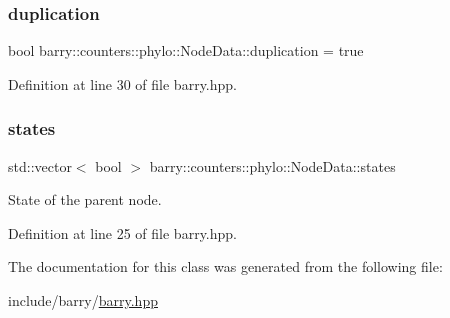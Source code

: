\subsubsection{\texorpdfstring{duplication}{duplication}}
{\footnotesize\ttfamily bool barry\+::counters\+::phylo\+::\+Node\+Data\+::duplication = true}



Definition at line 30 of file barry.\+hpp.

\mbox{\label{classbarry_1_1counters_1_1phylo_1_1_node_data_a9a88332b03b6c78f386a1fafac660052}} 
\subsubsection{\texorpdfstring{states}{states}}
{\footnotesize\ttfamily std\+::vector$<$ bool $>$ barry\+::counters\+::phylo\+::\+Node\+Data\+::states}

State of the parent node. 

Definition at line 25 of file barry.\+hpp.



The documentation for this class was generated from the following file\+:\begin{DoxyCompactItemize}
\item 
include/barry/\hyperlink{barry_8hpp}{barry.\+hpp}\end{DoxyCompactItemize}
